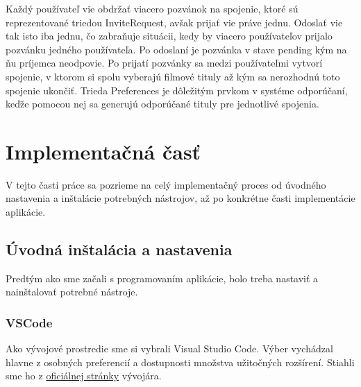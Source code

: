 Každý používateľ vie obdržať viacero pozvánok na spojenie, ktoré sú reprezentované triedou InviteRequest, avšak prijať vie práve jednu. Odoslať vie tak isto iba jednu, čo zabraňuje situácii, kedy by viacero používateľov prijalo pozvánku jedného používateľa. Po odoslaní je pozvánka v stave pending kým na ňu príjemca neodpovie. Po prijatí pozvánky sa medzi používateľmi vytvorí spojenie, v ktorom si spolu vyberajú filmové tituly až kým sa nerozhodnú toto spojenie ukončiť. Trieda Preferences je dôležitým prvkom v systéme odporúčaní, keďže pomocou nej sa generujú odporúčané tituly pre jednotlivé spojenia.


\section{Implementačná časť}
V tejto časti práce sa pozrieme na celý implementačný proces od úvodného nastavenia a inštalácie potrebných nástrojov, až po konkrétne časti implementácie aplikácie.

\subsection{Úvodná inštalácia a nastavenia}
Predtým ako sme začali s programovaním aplikácie, bolo treba nastaviť a nainštalovať potrebné nástroje.
\subsubsection{VSCode}
Ako vývojové prostredie sme si vybrali Visual Studio Code. Výber vychádzal hlavne z osobných preferencií a dostupnosti množstva užitočných rozšírení. Stiahli sme ho z \href{https://code.visualstudio.com/download}{oficiálnej stránky} vývojára.
